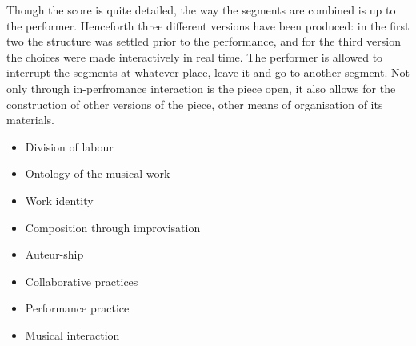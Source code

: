 \documentclass[a4paper,hidelinks]{article}
\begin{document}
Though the score is quite detailed, the way the segments are combined is up to the performer. Henceforth three different versions have been produced: in the first two the structure was settled prior to the performance, and for the third version the choices were made interactively in real time. The performer is allowed to interrupt the segments at whatever place, leave it and go to another segment. Not only through in-perfromance interaction is the piece open, it also allows for the construction of other versions of the piece, other means of organisation of its materials.

\begin{itemize}
\item Division of labour
\item Ontology of the musical work
\item Work identity
\item Composition through improvisation
\item Auteur-ship
\item Collaborative practices
\item Performance practice
\item Musical interaction
\end{itemize}
\end{document}
